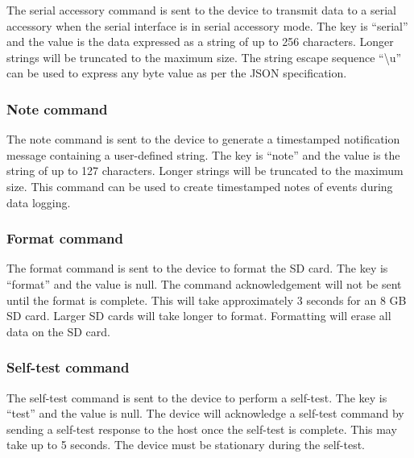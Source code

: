 The serial accessory command is sent to the device to transmit data to a serial accessory when the serial interface is in serial accessory mode.  The key is \enquote{serial} and the value is the data expressed as a string of up to 256 characters.  Longer strings will be truncated to the maximum size.  The string escape sequence \enquote{\textbackslash u} can be used to express any byte value as per the \ac{JSON} specification.


\subsubsection{Note command}

The note command is sent to the device to generate a timestamped notification message containing a user-defined string.  The key is \enquote{note} and the value is the string of up to 127 characters.  Longer strings will be truncated to the maximum size.  This command can be used to create timestamped notes of events during data logging.


\subsubsection{Format command}

The format command is sent to the device to format the SD card.  The key is \enquote{format} and the value is null.  The command acknowledgement will not be sent until the format is complete.  This will take approximately 3 seconds for an 8 GB SD card.  Larger SD cards will take longer to format.  Formatting will erase all data on the SD card.


\subsubsection{Self-test command}

The self-test command is sent to the device to perform a self-test.  The key is \enquote{test} and the value is null.  The device will acknowledge a self-test command by sending a self-test response to the host once the self-test is complete.  This may take up to 5 seconds.  The device must be stationary during the self-test.

